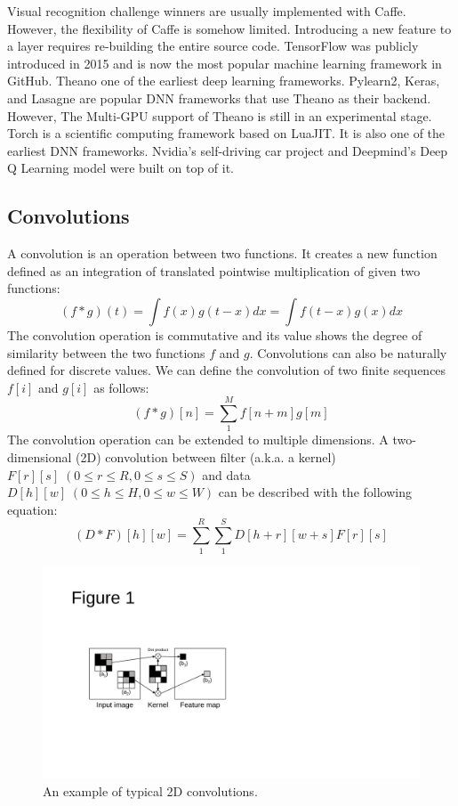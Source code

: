 Visual recognition challenge winners are usually implemented with Caffe\cite{ILSVRC15, RCNN, vgg}. However, the flexibility of Caffe is somehow limited. Introducing a new feature to a layer requires re-building the entire source code. TensorFlow was publicly introduced in 2015 and is now the most popular machine learning framework in GitHub\cite{github}. Theano one of the earliest deep learning frameworks. Pylearn2\cite{pylearn2}, Keras\cite{keras}, and Lasagne\cite{lasagne} are popular DNN frameworks that use Theano as their backend. However, The Multi-GPU support of Theano is still in an experimental stage. Torch is a scientific computing framework based on LuaJIT\cite{torch}. It is also one of the earliest DNN frameworks. Nvidia's self-driving car project\cite{nvdave} and Deepmind's Deep Q Learning model\cite{mnih2015humanlevel} were built on top of it.

\subsection{Convolutions}
A convolution is an operation between two functions. It creates a new function defined as an integration of translated pointwise multiplication of given two functions:
\begin{equation}
\left ( f * g \right )(t) = \int f(x)g(t-x)dx = \int f(t-x)g(x)dx
\label{def_convolution}
\end{equation}
The convolution operation is commutative and its value shows the degree of similarity between the two functions $f$ and $g$. Convolutions can also be naturally defined for discrete values. We can define the convolution of two finite sequences $f[i]$ and $g[i]$ as follows:
\begin{equation}
\label{def_discrete}
\left ( f * g \right )[n] = \sum_{1}^{M} f[n + m]g[m]
\end{equation}
The convolution operation can be extended to multiple dimensions. A two-dimensional (2D) convolution between filter (a.k.a. a kernel) $F[r][s] \; (0 \leq r \leq R, 0 \leq s \leq S)$ and data $D[h][w] \; (0 \leq h \leq H, 0 \leq w \leq W)$ can be described with the following equation:
\begin{equation}
\label{def_2d}
\left ( D * F \right )[h][w] = \sum_{1}^{R}\sum_{1}^{S} D[h + r][w + s] F[r][s]
\label{2d-conv}
\end{equation}

\begin{figure}[htbp]
  \centering
  \includegraphics[width=0.7\linewidth]{./figures/feature-map}
  \caption{An example of typical 2D convolutions. }
  \label{fig_conv}
\end{figure}

